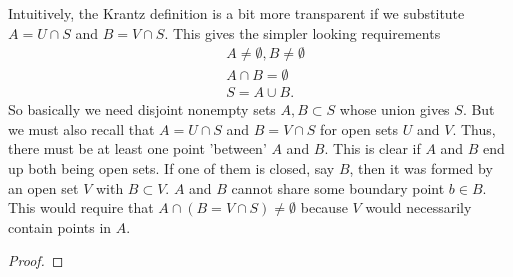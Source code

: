 \documentclass{article}
\begin{document}
Intuitively, the Krantz definition is a bit more transparent if we substitute \( A = U \cap S \)
and  \( B = V \cap S \). This gives the simpler looking requirements
\begin{align*}
        &A \ne \emptyset, B \ne \emptyset\\
        &A \cap B = \emptyset\\
        &S = A \cup B.
\end{align*}
So basically we need disjoint nonempty sets \( A,B \subset S \) whose union gives \( S \).
But we must also recall that \( A = U \cap S \) and \( B = V \cap S \) for open sets \( U \) 
and \( V \). Thus, there must be at least one point 'between' \( A \) and \( B \). This 
is clear if \( A \) and \( B \) end up both being open sets. If one of them is closed, say \( B \),
then it was formed by an open set \( V \) with \( B \subset V \). \( A \) and \( B \) cannot share
some boundary point \( b \in B \). This would require that \( A \cap (B = V \cap S) \ne \emptyset \)
because \( V \) would necessarily contain points in \( A \).

\begin{proof}

\end{proof}
\end{document}
